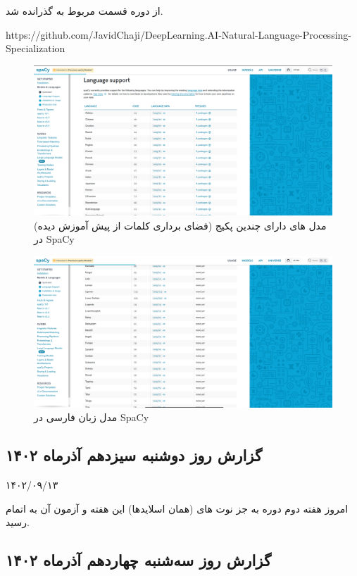 از دوره  قسمت مربوط به  گذرانده شد.

https://github.com/JavidChaji/DeepLearning.AI-Natural-Language-Processing-Specialization


\begin{figure}
    \includegraphics[width=\linewidth]{Images/SpaCy_English_Model.png}
    \caption{مدل های دارای چندین پکیج (فضای برداری کلمات از پیش آموزش دیده) در SpaCy}
\end{figure}

\begin{figure}
    \includegraphics[width=\linewidth]{Images/SpaCy_Persian_Model.png}
    \caption{مدل زبان فارسی در SpaCy}
\end{figure}


\subsection{گزارش روز دوشنبه سیزدهم آذر‌ماه ۱۴۰۲}

۱۴۰۲/۰۹/۱۳

امروز هفته دوم دوره  به جز نوت های (همان اسلایدها) این هفته و آزمون آن به اتمام رسید.


\subsection{گزارش روز سه‌شنبه چهاردهم آذر‌ماه ۱۴۰۲}

